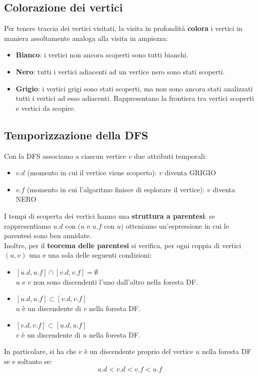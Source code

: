 \subsection{Colorazione dei vertici}
Per tenere traccia dei vertici visitati, la visita in profondità \textbf{colora} i vertici in maniera assoltamente analoga alla visita in ampiezza:
    \begin{itemize}
        \item{\textbf{Bianco}: i vertici non ancora scoperti sono tutti bianchi.}
        \item{\textbf{Nero}: tutti i vertici adiacenti ad un vertice nero sono stati scoperti.}
        \item{\textbf{Grigio}: i vertici grigi sono stati scoperti, ma non sono ancora stati analizzati tutti i vertici ad esso adiacenti. Rappresentano la frontiera tra vertici scoperti e vertici da scopire.}
    \end{itemize}

\subsection{Temporizzazione della DFS}
Con la DFS associamo a ciascun vertice $v$ due attributi temporali:
    \begin{itemize}
        \item{$v.d$ (momento in cui il vertice viene scoperto): $v$ diventa GRIGIO}
        \item{$v.f$ (momento in cui l'algoritmo finisce di esplorare il vertice): $v$ diventa NERO}
    \end{itemize}
I tempi di scoperta dei vertici hanno una \textbf{struttura a parentesi}: se rappresentiamo $u.d$ con $(u$ e $u.f$ con $u)$ otteniamo un'espressione in cui le parentesi sono ben annidate.\\
Inoltre, per il \textbf{teorema delle parentesi} si verifica, per ogni coppia di vertici $(u,v)$ una e una sola delle seguenti condizioni:
    \begin{itemize}
        \item{$[u.d, u.f] \cap [v.d, v.f] = \emptyset$\\
        $u$ e $v$ non sono discendenti l'uno dall'altro nella foresta DF.}
        \item{$[u.d, u.f] \subset [v.d, v.f]$\\
        $u$ è un discendente di $v$ nella foresta DF.}
        \item{$[v.d, v.f] \subset [u.d, u.f]$\\
        $v$ è un discendente di $u$ nella foresta DF.}
    \end{itemize}
In particolare, si ha che $v$ è un discendente proprio del vertice $u$ nella foresta DF se e soltanto se:
    \begin{equation}
        u.d < v.d < v.f < u.f
    \end{equation}
    
